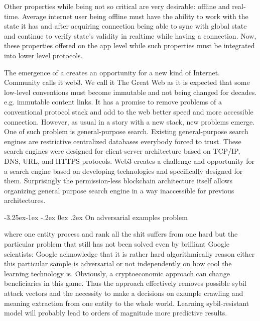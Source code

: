 \documentclass[8pt,oneside]{amsart}
\makeatletter
\newcommand{\linkgreen}[2]{\href{#1}{\color{green}{#2}}}
\renewcommand\subsection{\@startsection{subsection}{2}{\z@}%
                                     {-3.25ex\@plus -1ex \@minus -.2ex}%
                                     {0ex \@plus .2ex}%
                                     {\play\Large}}%
\newcommand{\titleSection}[1]{\subsection{#1}}
\newcommand{\code}[1]{{\PlayBold #1}}
\makeatother
\begin{document}
Other properties while being not so critical are very desirable: offline and real-time. Average internet user being offline must have the ability to work with the state it has and after acquiring connection being able to sync with global state and continue to verify state's validity in realtime while having a connection. Now, these properties offered on the app level while such properties must be integrated into lower level protocols.

The emergence of a \linkgreen{https://ipfs.io/ipfs/Qmf3eHU9idMUZgx6MKhCsFPWL24X9pDUi2ECqyH8UtBAMQ}{a new stack} creates an opportunity for a new kind of Internet. Community calls it \code{web3}. We call it \code{The Great Web} as it is expected that some low-level conventions must become immutable and not being changed for decades. e.g. immutable content links. It has a promise to remove problems of a conventional protocol stack and add to the web better speed and more accessible connection. However, as usual in a story with a new stack, new problems emerge. One of such problem is general-purpose search. Existing general-purpose search engines are restrictive centralized databases everybody forced to trust. These search engines were designed for client-server architecture based on TCP/IP, DNS, URL, and HTTPS protocols. Web3 creates a challenge and opportunity for a search engine based on developing technologies and specifically designed for them. Surprisingly the permission-less blockchain architecture itself allows organizing general purpose search engine in a way inaccessible for previous architectures.

\titleSection{On adversarial examples problem}\label{adversarial-examples}

\linkgreen{https://ipfs.io/ipfs/QmeS4LjoL1iMNRGuyYSx78RAtubTT2bioSGnsvoaupcHR6}{Conventional architecture of search engines} where one entity process and rank all the shit suffers from one hard but the particular problem that still has not been solved even by brilliant Google scientists: \linkgreen{https://ipfs.io/ipfs/QmNrAFz34SLqkzhSg4wAYYJeokfJU5hBEpkT4hPRi226y9}{adversarial examples problem.} Google acknowledge that it is rather hard algorithmically reason either this particular sample is adversarial or not independently on how cool the learning technology is. Obviously, a cryptoeconomic approach can change beneficiaries in this game. Thus the approach effectively removes possible sybil attack vectors and the necessity to make a decisions on example crawling and meaning extraction from one entity to the whole world. Learning sybil-resistant model will probably lead to orders of magnitude more predictive results.
\end{document}
